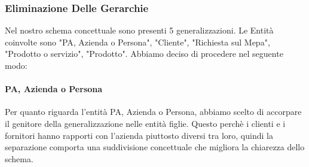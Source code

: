

\newpage
\subsubsection{Eliminazione Delle Gerarchie}

Nel nostro schema concettuale sono presenti 5 generalizzazioni. Le Entità coinvolte sono "PA, Azienda o Persona", "Cliente", "Richiesta sul Mepa", "Prodotto o servizio", "Prodotto".
\newline
Abbiamo deciso di procedere nel seguente modo:

\paragraph{PA, Azienda o Persona}
Per quanto riguarda l'entità PA, Azienda o Persona, abbiamo scelto di accorpare il genitore della generalizzazione nelle entità figlie. Questo perchè i clienti e i fornitori hanno rapporti con l'azienda piuttosto diversi tra loro, quindi la separazione comporta una suddivisione concettuale che migliora la chiarezza dello schema.
